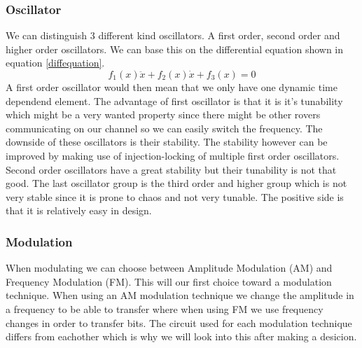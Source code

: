 \documentclass[10pt,a4paper]{article}
\begin{document}
\subsubsection{Oscillator}
We can distinguish 3 different kind oscillators. A first order, second order and higher order oscillators. We can base this on the differential equation shown in equation \ref{diffequation}.
\begin{equation}
\label{diffequation}
f_1(x)\ddot{x} + f_2(x)\dot{x} + f_3(x) = 0
\end{equation}
A first order oscillator would then mean that we only have one dynamic time dependend element. The advantage of first oscillator is that it is it's tunability which might be a very wanted property since there might be other rovers communicating on our channel so we can easily switch the frequency. The downside of these oscillators is their stability. The stability however can be improved by making use of injection-locking of multiple first order oscillators. Second order oscillators have a great stability but their tunability is not that good. The last oscillator group is the third order and higher group which is not very stable since it is prone to chaos and not very tunable. The positive side is that it is relatively easy in design.

\subsubsection{Modulation}
When modulating we can choose between Amplitude Modulation (AM) and Frequency Modulation (FM). This will our first choice toward a modulation technique. When using an AM modulation technique we change the amplitude in a frequency to be able to transfer where when using FM we use frequency changes in order to transfer bits. The circuit used for each modulation technique differs from eachother which is why we will look into this after making a desicion. 
\end{document}
